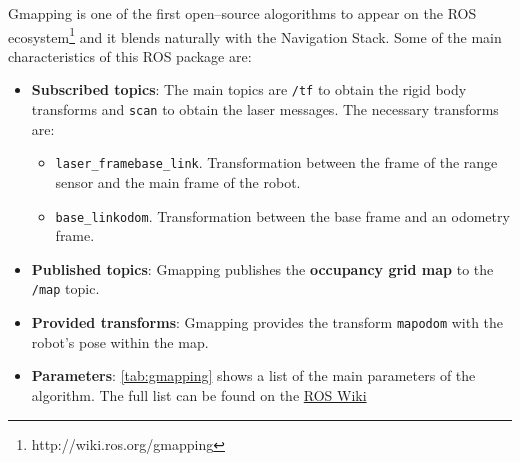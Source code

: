 Gmapping is one of the first open--source alogorithms to appear on the ROS ecosystem\footnote{http://wiki.ros.org/gmapping} and it blends naturally with the Navigation Stack. Some of the main characteristics of this ROS package are:
\begin{itemize}
  \item \textbf{Subscribed topics}: The main topics are \texttt{/tf} to obtain the rigid body transforms and \texttt{scan} to obtain the laser messages. The necessary transforms are:
  \begin{itemize}
    \item \texttt{laser\_frame}\arrow\texttt{base\_link}. Transformation between the frame of the range sensor and the main frame of the robot.
    \item \texttt{base\_link}\arrow\texttt{odom}. Transformation between the base frame and an odometry frame.
  \end{itemize}  

  \item \textbf{Published topics}: Gmapping publishes the \textbf{occupancy grid map} to the \texttt{/map} topic.

  \item \textbf{Provided transforms}: Gmapping provides the transform \texttt{map}\arrow\texttt{odom} with the robot's pose within the map.

  \item \textbf{Parameters}: \autoref{tab:gmapping} shows a list of the main parameters of the algorithm. The full list can be found on the \href{http://wiki.ros.org/gmapping}{ROS Wiki}
\end{itemize}

\begin{table}[htb]
  \centering
  \caption{Gmapping main parameters}
  \label{tab:gmapping}
\end{table} 

